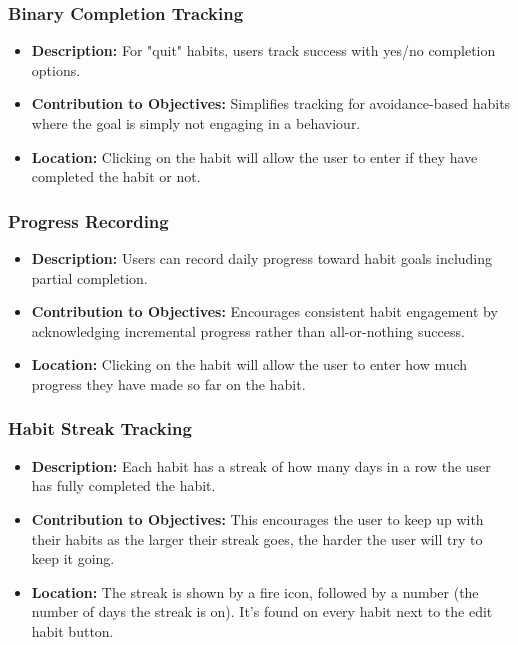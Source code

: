 \subsubsection{Binary Completion Tracking}
\begin{itemize}
    \item \textbf{Description:} For "quit" habits, users track success with yes/no completion options.
    \item \textbf{Contribution to Objectives:} Simplifies tracking for avoidance-based habits where the goal is simply not engaging in a behaviour.
    \item \textbf{Location:} Clicking on the habit will allow the user to enter if they have completed the habit or not.
\end{itemize}

\subsubsection{Progress Recording}
\begin{itemize}
    \item \textbf{Description:} Users can record daily progress toward habit goals including partial completion.
    \item \textbf{Contribution to Objectives:} Encourages consistent habit engagement by acknowledging incremental progress rather than all-or-nothing success.
    \item \textbf{Location:} Clicking on the habit will allow the user to enter how much progress they have made so far on the habit.
\end{itemize}

\subsubsection{Habit Streak Tracking}
\begin{itemize}
    \item \textbf{Description:} Each habit has a streak of how many days in a row the user has fully completed the habit.
    \item \textbf{Contribution to Objectives:} This encourages the user to keep up with their habits as the larger their streak goes, the harder the user will try to keep it going.
    \item \textbf{Location:} The streak is shown by a fire icon, followed by a number (the number of days the streak is on). It's found on every habit next to the edit habit button.
\end{itemize}

